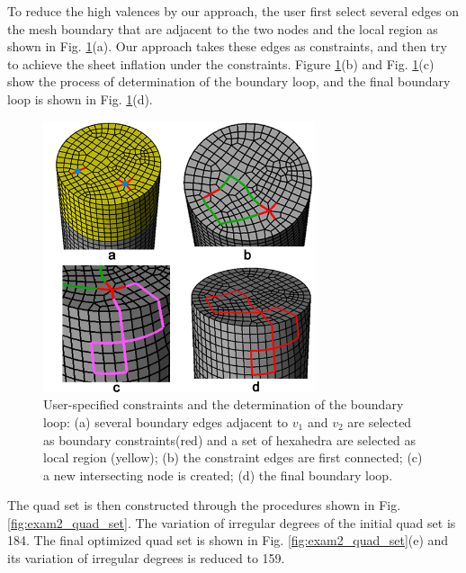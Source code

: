 \documentclass[final,5p,times,twocolumn]{elsarticle}
\begin{document}
To reduce the high valences by our approach, the user first select several edges on the mesh boundary that are adjacent to the two nodes and the local region as shown in Fig. \ref{fig:exam2_bound_loop}(a). Our approach takes these edges as constraints, and then try to achieve the sheet inflation under the constraints. Figure \ref{fig:exam2_bound_loop}(b) and Fig. \ref{fig:exam2_bound_loop}(c) show the process of determination of the boundary loop, and the final boundary loop is shown in Fig. \ref{fig:exam2_bound_loop}(d).

\begin{figure}[htbp]
\begin{center}
\includegraphics[width=8cm]{exam2_bound_loop.png}
\caption{User-specified constraints and the determination of the boundary loop: (a) several boundary edges adjacent to $v_1$ and $v_2$ are selected as boundary constraints(red) and a set of hexahedra are selected as local region (yellow); (b) the constraint edges are first connected; (c) a new intersecting node is created; (d) the final boundary loop.}
\label{fig:exam2_bound_loop}
\end{center}
\end{figure}

The quad set is then constructed through the procedures shown in Fig. \ref{fig:exam2_quad_set}. The variation of irregular degrees of the initial quad set is 184. The final optimized quad set is shown in Fig. \ref{fig:exam2_quad_set}(e) and its variation of irregular degrees is reduced to 159.
\end{document}
